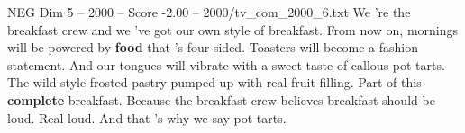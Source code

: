 \begin{textsample}{NEG Dim 5 – 2000 – Score -2.00 – 2000/tv\_com\_2000\_6.txt}  \label{ex:f5_neg_033}
We 're the breakfast crew and we 've got our own style of breakfast.
From now on, mornings will be powered by \textbf{food} that 's four-sided.
Toasters will become a fashion statement.
And our tongues will vibrate with a sweet taste of callous pot tarts.
The wild style frosted pastry pumped up with real fruit filling.
Part of this \textbf{complete} breakfast.
Because the breakfast crew believes breakfast should be loud.
Real loud.
And that 's why we say pot tarts.

\end{textsample}
